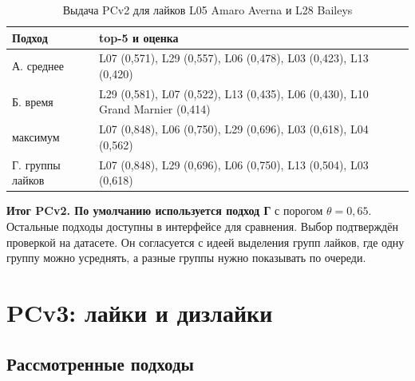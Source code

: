 \begin{table}[H]
	\centering
	\caption{Выдача PCv2 для лайков L05 Amaro Averna и L28 Baileys}
	\label{tab:lr3_v2_example}
	\footnotesize
	\begin{tabular}{|L{3.4cm}|L{11.6cm}|}
		\hline
		Подход & top-5 и оценка \\ \hline
		А. среднее & L07 (0,571), L29 (0,557), L06 (0,478), L03 (0,423), L13 (0,420) \\ \hline
		Б. время & L29 (0,581), L07 (0,522), L13 (0,435), L06 (0,430), L10 Grand Marnier (0,414) \\ \hline
		максимум & L07 (0,848), L06 (0,750), L29 (0,696), L03 (0,618), L04 (0,562) \\ \hline
		Г. группы лайков & L07 (0,848), L29 (0,696), L06 (0,750), L13 (0,504), L03 (0,618) \\ \hline
	\end{tabular}
\end{table}

\textbf{Итог PCv2. По умолчанию используется подход Г} с порогом $\theta = 0{,}65$. Остальные подходы доступны в интерфейсе для сравнения. Выбор подтверждён проверкой на датасете. Он согласуется с идеей выделения групп лайков, где одну группу можно усреднять, а разные группы нужно показывать по очереди.

\section{PCv3: лайки и дизлайки}

\subsection{Рассмотренные подходы}

